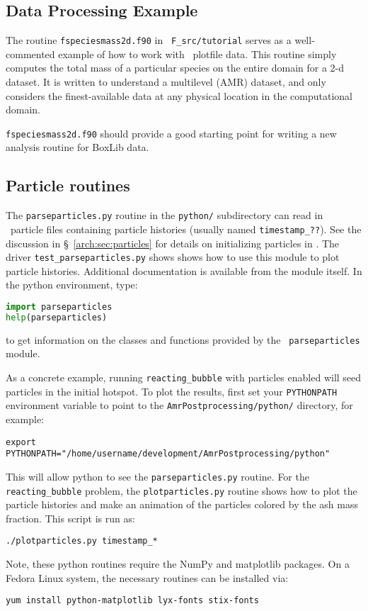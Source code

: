 \subsection{Data Processing Example}

The routine {\tt fspeciesmass2d.f90} in {\tt
  F\_src/tutorial} serves as a well-commented example of how
to work with \maestro\ plotfile data.  This routine simply computes
the total mass of a particular species on the entire domain for a 2-d
dataset.  It is written to understand a multilevel (AMR) dataset, and
only considers the finest-available data at any physical location in
the computational domain.

{\tt fspeciesmass2d.f90} should provide a good starting point for
writing a new analysis routine for BoxLib data.

\subsection{Particle routines}

\label{analysis:sec:particles}

The {\tt parseparticles.py} routine in the {\tt python/} subdirectory
can read in \maestro\ particle files containing particle histories
(usually named {\tt timestamp\_??}).  See the discussion in
\S~\ref{arch:sec:particles} for details on initializing particles in
\maestro.  The driver {\tt test\_parseparticles.py} shows shows how to
use this module to plot particle histories.  Additional documentation
is available from the module itself.  In the python environment,
type:
\begin{lstlisting}[language=Python]
import parseparticles
help(parseparticles)
\end{lstlisting}
to get information on the classes and functions provided by the {\tt
  parseparticles} module.

As a concrete example, running {\tt reacting\_bubble} with particles enabled
will seed particles in the initial hotspot.  To plot the results,
first set your {\tt PYTHONPATH} environment variable to point to the
{\tt AmrPostprocessing/python/} directory, for example:
\begin{verbatim}
export PYTHONPATH="/home/username/development/AmrPostprocessing/python"
\end{verbatim}
This will allow python to see the {\tt parseparticles.py} routine.
For the {\tt reacting\_bubble} problem, the {\tt plotparticles.py} routine shows
how to plot the particle histories and make an animation of the
particles colored by the ash mass fraction.  This script is run as:
\begin{verbatim}
./plotparticles.py timestamp_*
\end{verbatim}

Note, these python routines require the NumPy and matplotlib packages.
On a Fedora Linux system, the necessary routines can be installed via:
\begin{verbatim}
yum install python-matplotlib lyx-fonts stix-fonts
\end{verbatim}




